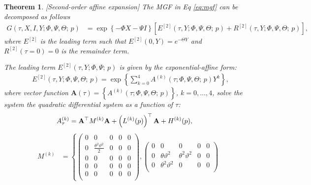 \documentclass[11pt,a4paper] {article}
\newtheorem{theorem}{Theorem}[section]
\begin{document}
\begin{theorem}\label{pr:b2} [Second-order affine expansion] The MGF in Eq \eqref{eq:mgf} can be decomposed as follows
\begin{equation}\label{eq:b21}
\begin{split}
G(\tau,X,I,Y; \Phi,\Psi,\Theta;\,p)& = \exp \left\{-\Phi X-\Psi I \right\}\left[ E^{[2]}(\tau,Y; \Phi,\Psi,\Theta;\,p)+ R^{[2]}(\tau,Y; \Phi,\Psi,\Theta;\,p)  \right],
\end{split}
\end{equation}
where $E^{[2]}$ is the leading term such that $E^{[2]}(0,Y)=e^{-\Theta Y}$  and $R^{[2]}(\tau=0)=0$ is the remainder term.


The leading term $E^{[2]}(\tau,Y; \Phi,\Psi;\,p)$ is given by the exponential-affine form:
\begin{equation}\label{eq:b22}
\begin{split}
& E^{[2]}(\tau,Y; \Phi,\Psi,\Theta;\,p)= \exp \left\{\sum^{4}_{k=0}A^{(k)}(\tau;\Phi,\Psi,\Theta;\,p)Y^{k}  \right\},
\end{split}
\end{equation}
where vector function $\mathbf{A}(\tau)=\left\{A^{(k)}(\tau;\Phi,\Psi,\Theta;\,p)\right\}$,  $k=0,...,4$, solve the system the quadratic differential system as a function of $\tau$: 
\begin{equation}\label{eq:OrigMGFLogAndQVOrd2}
\begin{split}
A^{(k)}_\tau&=\mathbf{A}^\top M^{(k)}\mathbf{A} + \left(L^{(k)}(p)\right)^\top\mathbf{A} + H^{(k)}(p),\vspace*{-1.0\baselineskip}
\end{split}
\end{equation}
\begin{equation*}
\begin{split}
M^{(k)}&=\left\{
\begin{pmatrix} %
0 & 0 & 0 & 0 & 0 \\
0 & \frac{\theta^2\vartheta^2}{2} & 0 & 0 & 0 \\
0 & 0 & 0 & 0 & 0 \\
0 & 0 & 0 & 0 & 0 \\
0 & 0 & 0 & 0 & 0 \\
\end{pmatrix}, 
\begin{pmatrix} %
0 & 0 & 0 & 0 & 0 \\
0 & \theta\vartheta^2 & \theta^2\vartheta^2 & 0 & 0 \\
0 & \theta^2\vartheta^2 & 0 & 0 & 0 \\

\end{pmatrix}
\end{split}
\end{equation*}
\end{theorem}
\end{document}
